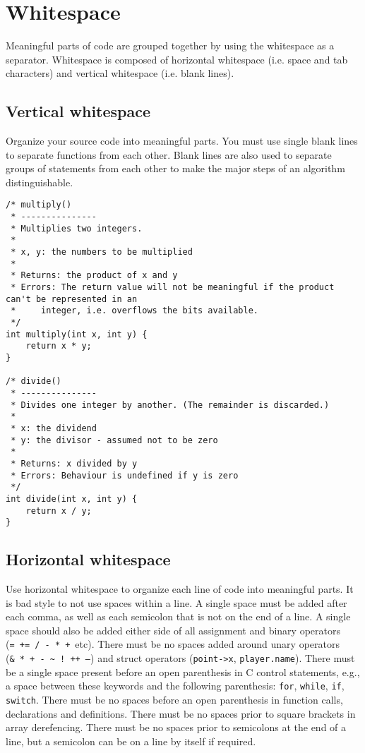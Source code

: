 \documentclass{article}
\newcommand{\propertilde}{\nolinkurl{~}}
\begin{document}
\section{Whitespace}
Meaningful parts of code are grouped together by using the whitespace as a separator.
Whitespace is composed of horizontal whitespace (i.e. space and tab characters) and vertical whitespace (i.e. blank lines).

\subsection{Vertical whitespace}
Organize your source code into meaningful parts.
You must use single blank lines to separate functions from each other.
Blank lines are also used to separate groups of statements from each other to make the major steps of an algorithm distinguishable.

\nolinenumbers
\begin{lstlisting}
/* multiply()
 * ---------------
 * Multiplies two integers.
 *
 * x, y: the numbers to be multiplied
 *
 * Returns: the product of x and y
 * Errors: The return value will not be meaningful if the product can't be represented in an 
 *     integer, i.e. overflows the bits available.
 */
int multiply(int x, int y) {
    return x * y;
}

/* divide()
 * ---------------
 * Divides one integer by another. (The remainder is discarded.)
 *
 * x: the dividend
 * y: the divisor - assumed not to be zero
 *
 * Returns: x divided by y 
 * Errors: Behaviour is undefined if y is zero
 */
int divide(int x, int y) {
    return x / y;
}
\end{lstlisting}
\linenumbers

\subsection{Horizontal whitespace}
Use horizontal whitespace to organize each line of code into meaningful parts.
It is bad style to not use spaces within a line.
A single space must be added after each comma, as well as each semicolon that is not on the end of a line.
A single space should also be added either side of all assignment and binary operators (\texttt{=~+=~/~-~*~+}~etc).
There must be no spaces added around unary operators (\texttt{\&~*~+~-~\propertilde~!~++~--}) and struct operators (\texttt{point->x}, \texttt{player.name}). There must be a single space present before an open parenthesis in C control statements, e.g., a space between these keywords and the following parenthesis: \texttt{for}, \texttt{while}, 
\texttt{if}, \texttt{switch}. There must be no spaces before an open parenthesis in function calls, declarations and 
definitions. There must be no spaces prior to square brackets in array derefencing. There must be no spaces 
prior to semicolons at the end of a line, but a semicolon can be on a line by itself if required. 
\end{document}
